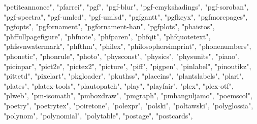 \documentclass[
]{article}
\newenvironment{Shaded}{\begin{snugshade}}{\end{snugshade}}
\newcommand{\NormalTok}[1]{#1}
\newcommand{\StringTok}[1]{\textcolor[rgb]{0.31,0.60,0.02}{#1}}
\begin{document}
\begin{Shaded}
\begin{Highlighting}[]
\StringTok{"petiteannonce"}\NormalTok{, }\StringTok{"pfarrei"}\NormalTok{, }\StringTok{"pgf"}\NormalTok{, }\StringTok{"pgf{-}blur"}\NormalTok{, }\StringTok{"pgf{-}cmykshadings"}\NormalTok{, }
\StringTok{"pgf{-}soroban"}\NormalTok{, }\StringTok{"pgf{-}spectra"}\NormalTok{, }\StringTok{"pgf{-}umlcd"}\NormalTok{, }\StringTok{"pgf{-}umlsd"}\NormalTok{, }\StringTok{"pgfgantt"}\NormalTok{, }
\StringTok{"pgfkeyx"}\NormalTok{, }\StringTok{"pgfmorepages"}\NormalTok{, }\StringTok{"pgfopts"}\NormalTok{, }\StringTok{"pgfornament"}\NormalTok{, }\StringTok{"pgfornament{-}han"}\NormalTok{, }
\StringTok{"pgfplots"}\NormalTok{, }\StringTok{"phaistos"}\NormalTok{, }\StringTok{"phffullpagefigure"}\NormalTok{, }\StringTok{"phfnote"}\NormalTok{, }\StringTok{"phfparen"}\NormalTok{, }
\StringTok{"phfqit"}\NormalTok{, }\StringTok{"phfquotetext"}\NormalTok{, }\StringTok{"phfsvnwatermark"}\NormalTok{, }\StringTok{"phfthm"}\NormalTok{, }\StringTok{"philex"}\NormalTok{, }
\StringTok{"philosophersimprint"}\NormalTok{, }\StringTok{"phonenumbers"}\NormalTok{, }\StringTok{"phonetic"}\NormalTok{, }\StringTok{"phonrule"}\NormalTok{, }
\StringTok{"photo"}\NormalTok{, }\StringTok{"physconst"}\NormalTok{, }\StringTok{"physics"}\NormalTok{, }\StringTok{"physunits"}\NormalTok{, }\StringTok{"piano"}\NormalTok{, }\StringTok{"picinpar"}\NormalTok{, }
\StringTok{"pict2e"}\NormalTok{, }\StringTok{"pictex2"}\NormalTok{, }\StringTok{"picture"}\NormalTok{, }\StringTok{"piff"}\NormalTok{, }\StringTok{"pigpen"}\NormalTok{, }\StringTok{"pinlabel"}\NormalTok{, }
\StringTok{"pinoutikz"}\NormalTok{, }\StringTok{"pittetd"}\NormalTok{, }\StringTok{"pixelart"}\NormalTok{, }\StringTok{"pkgloader"}\NormalTok{, }\StringTok{"pkuthss"}\NormalTok{, }\StringTok{"placeins"}\NormalTok{, }
\StringTok{"plantslabels"}\NormalTok{, }\StringTok{"plari"}\NormalTok{, }\StringTok{"plates"}\NormalTok{, }\StringTok{"platex{-}tools"}\NormalTok{, }\StringTok{"plautopatch"}\NormalTok{, }
\StringTok{"play"}\NormalTok{, }\StringTok{"playfair"}\NormalTok{, }\StringTok{"plex"}\NormalTok{, }\StringTok{"plex{-}otf"}\NormalTok{, }\StringTok{"plweb"}\NormalTok{, }\StringTok{"pm{-}isomath"}\NormalTok{, }
\StringTok{"pmboxdraw"}\NormalTok{, }\StringTok{"pmgraph"}\NormalTok{, }\StringTok{"pmhanguljamo"}\NormalTok{, }\StringTok{"poemscol"}\NormalTok{, }\StringTok{"poetry"}\NormalTok{, }
\StringTok{"poetrytex"}\NormalTok{, }\StringTok{"poiretone"}\NormalTok{, }\StringTok{"polexpr"}\NormalTok{, }\StringTok{"polski"}\NormalTok{, }\StringTok{"poltawski"}\NormalTok{, }\StringTok{"polyglossia"}\NormalTok{, }
\StringTok{"polynom"}\NormalTok{, }\StringTok{"polynomial"}\NormalTok{, }\StringTok{"polytable"}\NormalTok{, }\StringTok{"postage"}\NormalTok{, }\StringTok{"postcards"}\NormalTok{, }

\end{Highlighting}
\end{Shaded}
\end{document}
